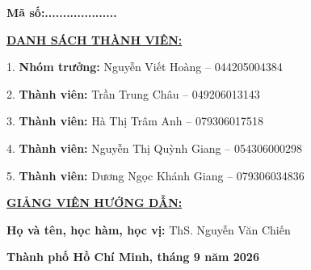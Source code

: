 \begin{titlepage}
\begin{center}
  \begin{minipage}{0.84\textwidth}
    \fontsize{11pt}{15.5pt}\selectfont
    
    \noindent\textbf{Mã số}\hspace{4.2cm}\textbf{:....................}\par
    \vspace{0.35cm}

    \noindent\underline{\textbf{DANH SÁCH THÀNH VIÊN:}}\par
    \vspace{0.25cm}
    \hspace*{1.2em}1. \textbf{Nhóm trưởng:} Nguyễn Viết Hoàng -- 044205004384\par
    \vspace{0.12cm}
    \hspace*{1.2em}2. \textbf{Thành viên:} Trần Trung Châu -- 049206013143\par
    \vspace{0.12cm}
    \hspace*{1.2em}3. \textbf{Thành viên:} Hà Thị Trâm Anh -- 079306017518\par
    \vspace{0.12cm}
    \hspace*{1.2em}4. \textbf{Thành viên:} Nguyễn Thị Quỳnh Giang -- 054306000298\par
    \vspace{0.12cm}
    \hspace*{1.2em}5. \textbf{Thành viên:} Dương Ngọc Khánh Giang -- 079306034836\par
    \vspace{0.65cm}

    \noindent\underline{\textbf{GIẢNG VIÊN HƯỚNG DẪN:}}\par
    \vspace{0.25cm}
    \noindent\textbf{Họ và tên, học hàm, học vị:} ThS. Nguyễn Văn Chiến\par
  \end{minipage}\par

  \vfill

  {\fontsize{11.5pt}{15pt}\selectfont\bfseries Thành phố Hồ Chí Minh, tháng 9 năm 2026}\par
  \vspace{0.2cm}
\end{center}

\end{titlepage}
